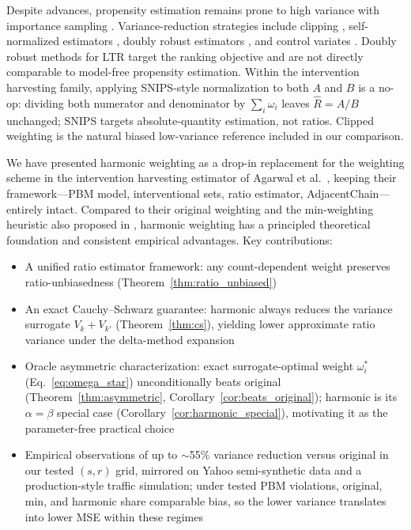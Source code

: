 \documentclass[sigconf]{acmart}
\begin{document}
Despite advances, propensity estimation remains prone to high variance with importance sampling \cite{swaminathan2015CRM}. Variance-reduction strategies include clipping \cite{bottou2013counterfactual}, self-normalized estimators \cite{swaminathan2015batch}, doubly robust estimators \cite{dudik2011doubly, oosterhuis2023DoublyRobustLTR}, and control variates \cite{kong1992note}. Doubly robust methods for LTR \cite{oosterhuis2023DoublyRobustLTR} target the ranking objective and are not directly comparable to model-free propensity estimation. Within the intervention harvesting family, applying SNIPS-style normalization to both $A$ and $B$ is a no-op: dividing both numerator and denominator by $\sum_i \omega_i$ leaves $\hat{R} = A/B$ unchanged; SNIPS targets absolute-quantity estimation, not ratios. Clipped weighting \cite{bottou2013counterfactual} is the natural biased low-variance reference included in our comparison.

We have presented harmonic weighting as a drop-in replacement for the weighting scheme in the intervention harvesting estimator of Agarwal et al.~\cite{agarwal2019estimating}, keeping their framework—PBM model, interventional sets, ratio estimator, AdjacentChain—entirely intact. Compared to their original weighting and the min-weighting heuristic also proposed in \cite{agarwal2019estimating}, harmonic weighting has a principled theoretical foundation and consistent empirical advantages. Key contributions:
\begin{itemize}
  \item A unified ratio estimator framework: any count-dependent weight preserves ratio-unbiasedness (Theorem~\ref{thm:ratio_unbiased})
  \item An exact Cauchy–Schwarz guarantee: harmonic always reduces the variance surrogate $V_k + V_{k'}$ (Theorem~\ref{thm:cs}), yielding lower approximate ratio variance under the delta-method expansion
  \item Oracle asymmetric characterization: exact surrogate-optimal weight $\omega_i^*$ (Eq.~\ref{eq:omega_star}) unconditionally beats original (Theorem~\ref{thm:asymmetric}, Corollary~\ref{cor:beats_original}); harmonic is its $\alpha{=}\beta$ special case (Corollary~\ref{cor:harmonic_special}), motivating it as the parameter-free practical choice
  \item Empirical observations of up to $\sim$55\% variance reduction versus original in our
        tested $(s, r)$ grid, mirrored on Yahoo semi-synthetic data and a production-style
        traffic simulation; under tested PBM violations, original, min, and harmonic share
        comparable bias, so the lower variance translates into lower MSE within these regimes
\end{itemize}
\end{document}
